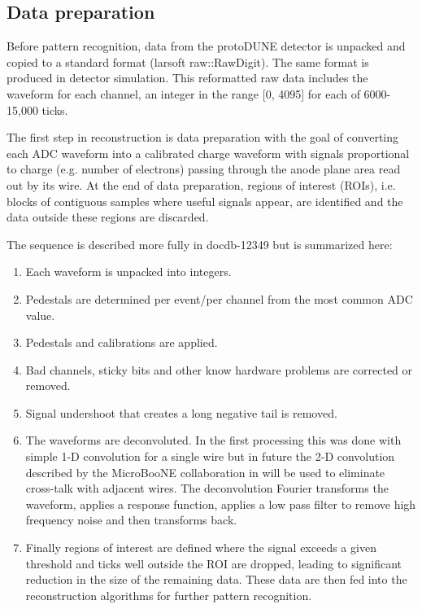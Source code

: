 \subsection{Data preparation}

Before pattern recognition, data from the protoDUNE detector is
unpacked and copied to a standard format (larsoft raw::RawDigit).
The same format is produced in detector simulation.
This reformatted raw data includes the waveform for each channel, an
integer in the range [0, 4095] for each of 6000-15,000 ticks.

The first step in reconstruction is data preparation with the goal of
converting each ADC waveform into a calibrated charge waveform with
signals proportional to charge (e.g. number of electrons) passing through
the anode plane area read out by its wire.
At the end of data preparation, regions of interest (ROIs), i.e. blocks of contiguous samples where
useful signals appear, are identified and the data outside these regions are discarded.


The sequence is described more fully in docdb-12349 but is summarized here:

\begin{enumerate}
\item Each waveform is unpacked into integers.
\item Pedestals are determined per event/per channel from the most common ADC value. 
\item Pedestals and calibrations are applied. %
\item Bad channels, sticky bits and other know hardware problems are corrected or removed.
\item Signal undershoot that creates a long negative tail is removed. 
\item The waveforms  are deconvoluted.  In the first processing this was done with simple 1-D convolution for a single wire but in future the 2-D convolution described by the MicroBooNE collaboration in  will be used to eliminate cross-talk with adjacent wires.  The deconvolution Fourier transforms the waveform, applies a response function, applies a low pass filter to remove high frequency noise and then transforms back.



\item Finally regions of interest are defined where the signal exceeds a given threshold and ticks well outside the ROI are dropped, leading to significant reduction in the size of the remaining data. These data are then fed into the reconstruction algorithms for further pattern recognition. %
\end{enumerate}




